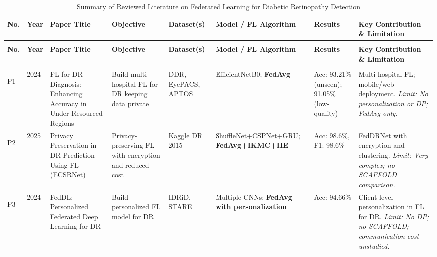 \documentclass[12pt, a4paper]{article}
\begin{document}
\begin{landscape}
\begin{scriptsize}
\setlength{\LTcapwidth}{\linewidth}
\setlength{\tabcolsep}{3pt}
\begin{longtable}{|>{\centering\bfseries}p{0.5cm}|p{0.6cm}|p{3.0cm}|p{2.5cm}|p{1.9cm}|p{2.8cm}|p{1.8cm}|p{3.4cm}|}
\caption{Summary of Reviewed Literature on Federated Learning for Diabetic Retinopathy Detection}
\label{tab:litreview}\\
\hline
\textbf{No.} & \textbf{Year} & \textbf{Paper Title} & \textbf{Objective} & \textbf{Dataset(s)} & \textbf{Model / FL Algorithm} & \textbf{Results} & \textbf{Key Contribution \& Limitation} \\
\hline
\endfirsthead
\multicolumn{8}{c}{\scriptsize\itshape (Table~\ref{tab:litreview} continued)}\\
\hline
\textbf{No.} & \textbf{Year} & \textbf{Paper Title} & \textbf{Objective} & \textbf{Dataset(s)} & \textbf{Model / FL Algorithm} & \textbf{Results} & \textbf{Key Contribution \& Limitation} \\
\hline
\endhead
\hline
\multicolumn{8}{r}{\scriptsize\itshape Continued on next page}\\
\endfoot
\hline
\endlastfoot

P1 & 2024 &
FL for DR Diagnosis: Enhancing Accuracy in Under-Resourced Regions &
Build multi-hospital FL for DR keeping data private &
DDR, EyePACS, APTOS &
EfficientNetB0; \textbf{FedAvg} &
Acc: 93.21\% (unseen); 91.05\% (low-quality) &
Multi-hospital FL; mobile/web deployment. \textit{Limit: No personalization or DP; FedAvg only.} \\
\hline

P2 & 2025 &
Privacy Preservation in DR Prediction Using FL (ECSRNet) &
Privacy-preserving FL with encryption and reduced cost &
Kaggle DR 2015 &
ShuffleNet+CSPNet+GRU; \textbf{FedAvg+IKMC+HE} &
Acc: 98.6\%, F1: 98.6\% &
FedDRNet with encryption and clustering. \textit{Limit: Very complex; no SCAFFOLD comparison.} \\
\hline

P3 & 2024 &
FedDL: Personalized Federated Deep Learning for DR &
Build personalized FL model for DR &
IDRiD, STARE &
Multiple CNNs; \textbf{FedAvg with personalization} &
Acc: 94.66\% &
Client-level personalization in FL for DR. \textit{Limit: No DP; no SCAFFOLD; communication cost unstudied.} \\
\hline


\end{longtable}
\end{scriptsize}
\end{landscape}
\end{document}
